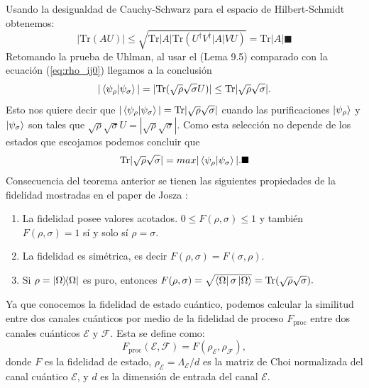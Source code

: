 \documentclass[letterpaper,12pt]{thesisECFM}
\theoremstyle{plain}
\theoremstyle{definition}
\theoremstyle{definition}
\theoremstyle{remark}
\newcommand{\1}{\mathbb{1}}
\begin{document}
    Usando la desigualdad de Cauchy-Schwarz \cite{nielsen_chuang_2011} para el espacio de Hilbert-Schmidt obtenemos:
    \begin{equation}
        |\text{Tr}(AU)| \leq \sqrt{ \text{Tr}|A| \text{Tr}(U^\dagger V^ \dagger  |A|VU) } = \text{Tr}|A| \blacksquare  
    \end{equation} 
    Retomando la prueba de Uhlman, al usar el (Lema 9.5) comparado con la ecuación (\ref{eq:rho_ij0})  llegamos a la conclusión
    \begin{equation}
        |\braket{\psi_\rho}{\psi_\sigma}| = |\text{Tr}(\sqrt{\rho} \sqrt{\sigma} U)| \leq \text{Tr}|\sqrt{\rho} \sqrt{\sigma} |.
    \end{equation}
    Esto nos quiere decir que $|\braket{\psi_\rho}{\psi_\sigma}| = \text{Tr}| \sqrt{\rho}\sqrt{\sigma}|$ cuando las purificaciones $\ket{\psi_\rho}$ y $\ket{\psi_\sigma}$ son tales que $\sqrt{\rho}\sqrt{\sigma} U = |\sqrt{\rho}\sqrt{\sigma}|$. Como esta selección no depende de los estados que escojamos podemos concluir que
    \begin{equation}
        \text{Tr}|\sqrt{\rho}\sqrt{\sigma}| = max | \braket{\psi_\rho}{\psi_\sigma}|. \blacksquare
    \end{equation}
    Consecuencia del teorema anterior se tienen las siguientes propiedades de la fidelidad mostradas en el paper de Josza \cite{Jozsa}:
    \begin{enumerate}
        \item La fidelidad posee valores acotados. $0 \leq F(\rho,\sigma) \leq 1$ y también $F(\rho,\sigma)=1 $ sí y solo sí $\rho=\sigma$.
	\item La fidelidad es simétrica, es decir  $F(\rho,\sigma) = F(\sigma,\rho).$
        \item Si $\rho= \ketbra{\Omega}{\Omega}$ es puro, entonces $F(\rho,\sigma)= \sqrt{\bra{\Omega}\sigma \ket{\Omega}} = \text{Tr}(\sqrt{\rho} \sqrt{\sigma}).$
    \end{enumerate}

    
Ya que conocemos la fidelidad de estado cuántico, podemos calcular la similitud entre dos canales cuánticos por medio de la  fidelidad de proceso $F_{\text{proc}}$ entre dos canales cuánticos $\mathcal{E}$ y $\mathcal{F}$. Esta se define como:
\begin{equation} \label{ec:fidel_proc}
F_{\text{proc}}(\mathcal{E}, \mathcal{F}) = F(\rho_{\mathcal{E}}, \rho_{\mathcal{F}}), 
\end{equation}
donde $F$ es la fidelidad de estado,  $\rho_{\mathcal{E}} =  \Lambda_{\mathcal{E}}/d $ es la matriz de Choi normalizada del canal cuántico $\mathcal{E}$, y $d$ es la dimensión de entrada del canal $\mathcal{E}$. 
\end{document}
